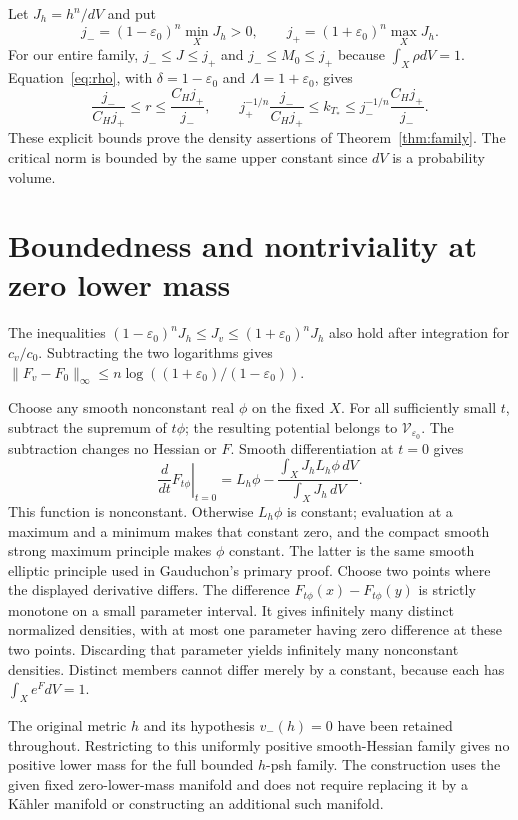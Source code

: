 \documentclass[11pt]{article}
\theoremstyle{remark}\newtheorem{remark}[theorem]{Remark}
\begin{document}
Let $J_h=h^n/dV$ and put
\[
 j_-=(1-\varepsilon_0)^n\min_XJ_h>0,\qquad
 j_+=(1+\varepsilon_0)^n\max_XJ_h.
\]
For our entire family, $j_-\leq J\leq j_+$ and
$j_-\leq M_0\leq j_+$ because $\int_X\rho dV=1$.
Equation~\eqref{eq:rho}, with
$\delta=1-\varepsilon_0$ and $\Lambda=1+\varepsilon_0$, gives
\[
 \frac{j_-}{C_Hj_+}\leq r\leq\frac{C_Hj_+}{j_-},
 \qquad
 j_+^{-1/n}\frac{j_-}{C_Hj_+}
       \leq k_{T_*}\leq
 j_-^{-1/n}\frac{C_Hj_+}{j_-}.
\]
These explicit bounds prove the density assertions of
Theorem~\ref{thm:family}. The critical norm is bounded by the
same upper constant since $dV$ is a probability volume.

\section{Boundedness and nontriviality at zero lower mass}
The inequalities
$(1-\varepsilon_0)^nJ_h\leq J_v\leq(1+\varepsilon_0)^nJ_h$
also hold after integration for $c_v/c_0$.
Subtracting the two logarithms gives
$\|F_v-F_0\|_\infty\leq
n\log((1+\varepsilon_0)/(1-\varepsilon_0))$.

Choose any smooth nonconstant real $\phi$ on the fixed $X$.
For all sufficiently small $t$, subtract the supremum of $t\phi$;
the resulting potential belongs to $\mathcal V_{\varepsilon_0}$.
The subtraction changes no Hessian or $F$.
Smooth differentiation at $t=0$ gives
\[
 \left.\frac{d}{dt}F_{t\phi}\right|_{t=0}
   =L_h\phi-
     \frac{\int_XJ_hL_h\phi\,dV}{\int_XJ_h\,dV}.
\]
This function is nonconstant. Otherwise $L_h\phi$ is constant;
evaluation at a maximum and a minimum makes that constant zero,
and the compact smooth strong maximum principle makes $\phi$
constant. The latter is the same smooth elliptic principle used
in Gauduchon's primary proof.
Choose two points where the displayed derivative differs. The
difference $F_{t\phi}(x)-F_{t\phi}(y)$ is strictly monotone on a
small parameter interval. It gives infinitely many distinct
normalized densities, with at most one parameter having zero
difference at these two points. Discarding that parameter yields
infinitely many nonconstant densities.
Distinct members cannot differ merely by a constant, because each
has $\int_Xe^FdV=1$.

The original metric $h$ and its hypothesis $v_-(h)=0$ have been
retained throughout. Restricting to this uniformly positive
smooth-Hessian family gives no positive lower mass for the full
bounded $h$-psh family. The construction uses the given fixed
zero-lower-mass manifold and does not require replacing it by a
K\"ahler manifold or constructing an additional such manifold.
\end{document}
